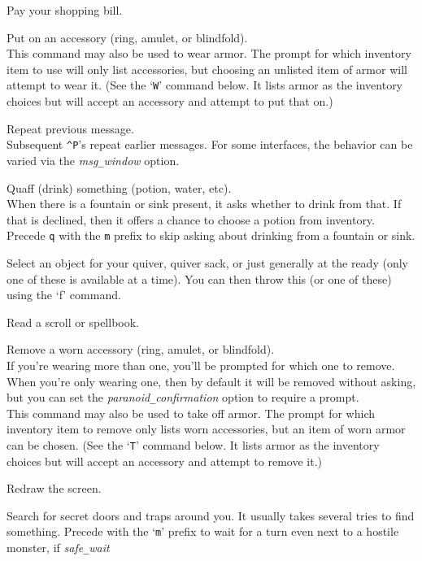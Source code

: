 Pay your shopping bill.
\item[\tb{P}]
Put on an accessory (ring, amulet, or blindfold).\\
This command may also be used to wear armor.  The prompt for
which inventory item to use will only list accessories, but choosing
an unlisted item of armor will attempt to wear it.
(See the `{\tt W}' command below.  It lists armor as the inventory
choices but will accept an accessory and attempt to put that on.)
\item[\tb{\^{}P}]
Repeat previous message.\\
Subsequent {\tt \^{}P}'s repeat earlier messages.
For some interfaces, the behavior can be varied via the
{\it msg\verb+_+window\/} option.
\item[\tb{q}]
Quaff (drink) something (potion, water, etc).\\
When there is a fountain or sink present, it asks whether to drink
from that.
If that is declined, then it offers a chance to choose a potion from
inventory.
Precede {\tt q} with the {\tt m} prefix to skip asking about
drinking from a fountain or sink.
\item[\tb{Q}]
Select an object for your quiver, quiver sack, or just generally at
the ready (only one of these is available at a time).  You can then throw
this (or one of these) using the `f' command.
\item[\tb{r}]
Read a scroll or spellbook.
\item[\tb{R}]
Remove a worn accessory (ring, amulet, or blindfold).\\
If you're wearing more than one, you'll be prompted for which one to
remove.  When you're only wearing one, then by default it will be removed
without asking, but you can set the
{\it paranoid\verb+_+confirmation\/}
option to require a prompt.\\
This command may also be used to take off armor.  The prompt for which
inventory item to remove only lists worn accessories, but an item of
worn armor can be chosen.
(See the `{\tt T}' command below.  It lists armor as the inventory
choices but will accept an accessory and attempt to remove it.)
\item[\tb{\^{}R}]
Redraw the screen.
\item[\tb{s}]
Search for secret doors and traps around you.
It usually takes several tries to find something.
Precede with the `{\tt m}' prefix to wait for a turn
even next to a hostile monster, if {\it safe\verb+_+wait\/}
